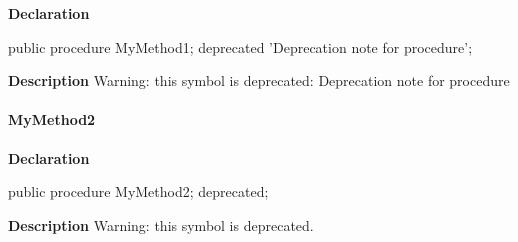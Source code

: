 \documentclass{report}
\newif\ifpdf
\begin{document}
\label{ok_deprecated_directive_note.TTestClass-MyMethod1}
\begin{list}{}{
\setlength{\itemindent}{0cm}
\setlength{\listparindent}{0cm}
\setlength{\leftmargin}{\evensidemargin}
\addtolength{\leftmargin}{\tmplength}
\settowidth{\labelsep}{X}
\addtolength{\leftmargin}{\labelsep}
\setlength{\labelwidth}{\tmplength}
}
\item[\textbf{Declaration}\hfill]
\ifpdf
\begin{flushleft}
\fi
\begin{ttfamily}
public procedure MyMethod1; deprecated 'Deprecation note for procedure';\end{ttfamily}

\ifpdf
\end{flushleft}
\fi

\par
\item[\textbf{Description}]
Warning: this symbol is deprecated: Deprecation note for procedure

 

\end{list}
\paragraph*{MyMethod2}\hspace*{\fill}

\label{ok_deprecated_directive_note.TTestClass-MyMethod2}
\begin{list}{}{
\setlength{\itemindent}{0cm}
\setlength{\listparindent}{0cm}
\setlength{\leftmargin}{\evensidemargin}
\addtolength{\leftmargin}{\tmplength}
\settowidth{\labelsep}{X}
\addtolength{\leftmargin}{\labelsep}
\setlength{\labelwidth}{\tmplength}
}
\item[\textbf{Declaration}\hfill]
\ifpdf
\begin{flushleft}
\fi
\begin{ttfamily}
public procedure MyMethod2; deprecated;\end{ttfamily}

\ifpdf
\end{flushleft}
\fi

\par
\item[\textbf{Description}]
Warning: this symbol is deprecated.

 

\end{list}
\ifpdf
\end{document}
